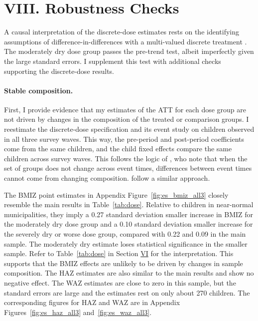 \section*{VIII. Robustness Checks}\label{sec:VIII}

A causal interpretation of the discrete-dose estimates rests on the identifying assumptions of difference-in-differences with a multi-valued discrete treatment \parencite{callawayDifferenceinDifferencesContinuousTreatment2024}. The moderately dry dose group passes the pre-trend test, albeit imperfectly given the large standard errors. I supplement this test with additional checks supporting the discrete-dose results.

\paragraph{Stable composition.} First, I provide evidence that my estimates of the ATT for each dose group are not driven by changes in the composition of the treated or comparison groups. I reestimate the discrete-dose specification and its event study on children observed in all three survey waves. This way, the pre-period and post-period coefficients come from the same children, and the child fixed effects compare the same children across survey waves. This follows the logic of \textcite{callawayDifferenceinDifferencesMultipleTime2021}, who note that when the set of groups does not change across event times, differences between event times cannot come from changing composition. \textcite{baileyWarPovertysExperiment2015} follow a similar approach.

The BMIZ point estimates in Appendix Figure~\ref{fig:es_bmiz_all3} closely resemble the main results in Table~\ref{tab:dose}. Relative to children in near-normal municipalities, they imply a 0.27 standard deviation smaller increase in BMIZ for the moderately dry dose group and a 0.10 standard deviation smaller increase for the severely dry or worse dose group, compared with 0.22 and 0.09 in the main sample. The moderately dry estimate loses statistical significance in the smaller sample. Refer to Table~\ref{tab:dose} in Section \hyperref[sec:VI]{VI} for the interpretation. This supports that the BMIZ effects are unlikely to be driven by changes in sample composition. The HAZ estimates are also similar to the main results and show no negative effect. The WAZ estimates are close to zero in this sample, but the standard errors are large and the estimates rest on only about 270 children. The corresponding figures for HAZ and WAZ are in Appendix Figures~\ref{fig:es_haz_all3} and~\ref{fig:es_waz_all3}.

